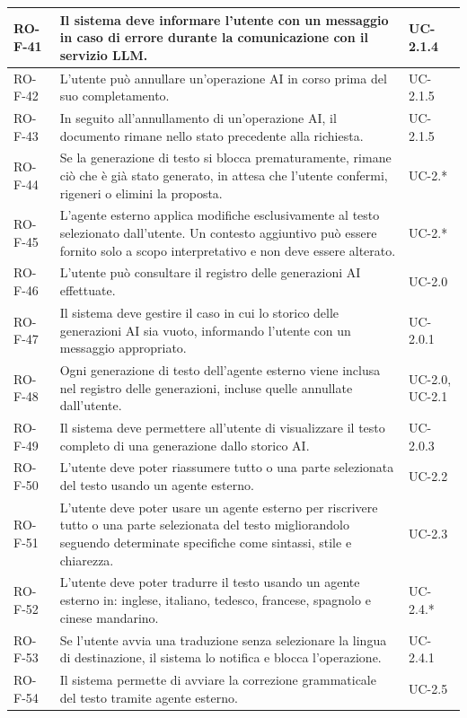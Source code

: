 \documentclass[11pt,a4paper]{article}
\begin{document}
\begin{longtable}{|p{}|>{\raggedright\arraybackslash}p{}|p{}|}
\hline
RO-F-41 & Il sistema deve informare l'utente con un messaggio in caso di errore durante la comunicazione con il servizio LLM. & UC-2.1.4 \\
\hline
RO-F-42 & L'utente può annullare un'operazione AI in corso prima del suo completamento. & UC-2.1.5 \\
\hline
RO-F-43 & In seguito all'annullamento di un'operazione AI, il documento rimane nello stato precedente alla richiesta. & UC-2.1.5 \\
\hline
RO-F-44 & Se la generazione di testo si blocca prematuramente, rimane ciò che è già stato generato, in attesa che l'utente confermi, rigeneri o elimini la proposta. & UC-2.* \\
\hline
RO-F-45 & L'agente esterno applica modifiche esclusivamente al testo selezionato dall'utente. Un contesto aggiuntivo può essere fornito solo a scopo interpretativo e non deve essere alterato. & UC-2.* \\
\hline
RO-F-46 & L'utente può consultare il registro delle generazioni AI effettuate. & UC-2.0 \\
\hline
RO-F-47 & Il sistema deve gestire il caso in cui lo storico delle generazioni AI sia vuoto, informando l'utente con un messaggio appropriato. & UC-2.0.1 \\
\hline
RO-F-48 & Ogni generazione di testo dell'agente esterno viene inclusa nel registro delle generazioni, incluse quelle annullate dall'utente. & UC-2.0, UC-2.1 \\
\hline
RO-F-49 & Il sistema deve permettere all'utente di visualizzare il testo completo di una generazione dallo storico AI. & UC-2.0.3 \\
\hline
RO-F-50 & L'utente deve poter riassumere tutto o una parte selezionata del testo usando un agente esterno. & UC-2.2 \\
\hline
RO-F-51 & L'utente deve poter usare un agente esterno per riscrivere tutto o una parte selezionata del testo migliorandolo seguendo determinate specifiche come sintassi, stile e chiarezza. & UC-2.3 \\
\hline
RO-F-52 & L'utente deve poter tradurre il testo usando un agente esterno in: inglese, italiano, tedesco, francese, spagnolo e cinese mandarino. & UC-2.4.* \\
\hline
RO-F-53 & Se l'utente avvia una traduzione senza selezionare la lingua di destinazione, il sistema lo notifica e blocca l'operazione. & UC-2.4.1 \\
\hline
RO-F-54 & Il sistema permette di avviare la correzione grammaticale del testo tramite agente esterno. & UC-2.5 \\

\end{longtable}
\end{document}
